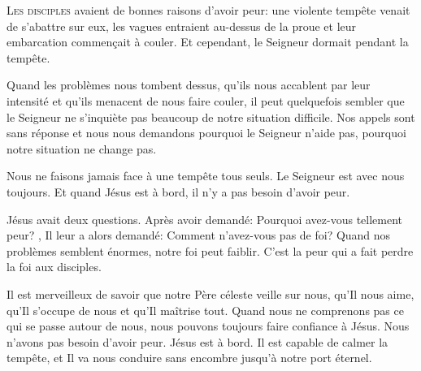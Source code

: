 \dvrule







\lettrine{L}{es disciples} avaient de bonnes raisons d'avoir peur:
 une violente tempête venait de s'abattre sur eux,
 les vagues entraient au-dessus de la proue et leur embarcation
 commen\c{c}ait à couler. Et cependant, le Seigneur dormait pendant la tempête.

Quand les problèmes nous tombent dessus, qu'ils nous accablent
 par leur intensité et qu'ils menacent de nous faire couler,
 il peut quelquefois sembler que le Seigneur ne s'inquiète pas beaucoup
 de notre situation difficile. Nos appels sont sans réponse
 et nous nous demandons pourquoi le Seigneur n'aide pas,
 pourquoi notre situation ne change pas.

Nous ne faisons jamais face à une tempête tous seuls.
 Le Seigneur est avec nous \ocadr toujours.
 Et quand Jésus est à bord, il n'y a pas besoin d'avoir peur.

Jésus avait deux questions. Après avoir demandé: 
 \Og Pourquoi avez-vous tellement peur? \Fg{}, Il leur a alors demandé: 
 \Og Comment n'avez-vous pas de foi? \Fg{}
 Quand nos problèmes semblent énormes, notre foi peut faiblir.
 C'est la peur qui a fait perdre la foi aux disciples.


Il est merveilleux de savoir que notre Père céleste veille sur nous,
 qu'Il nous aime, qu'Il s'occupe de nous et qu'Il maîtrise tout.
 Quand nous ne comprenons pas ce qui se passe autour de nous,
 nous pouvons toujours faire confiance à Jésus.
 Nous n'avons pas besoin d'avoir peur. Jésus est à bord.
 Il  est capable de calmer la tempête,
 et Il va nous conduire sans encombre jusqu'à notre port éternel.


